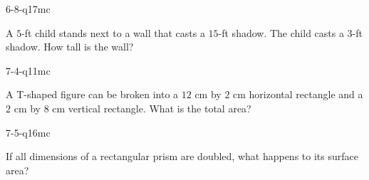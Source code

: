 \begin{practiceQuestion}{6-8-q17}{mc}
\begin{questionText}
A $5$-ft child stands next to a wall that casts a $15$-ft shadow. The child casts a $3$-ft shadow. How tall is the wall?
\end{questionText}
\end{practiceQuestion}

\begin{practiceQuestion}{7-4-q11}{mc}
\begin{questionText}
A T-shaped figure can be broken into a $12$ cm by $2$ cm horizontal rectangle and a $2$ cm by $8$ cm vertical rectangle. What is the total area?
\end{questionText}
\end{practiceQuestion}

\begin{practiceQuestion}{7-5-q16}{mc}
\begin{questionText}
If all dimensions of a rectangular prism are doubled, what happens to its surface area?
\end{questionText}
\end{practiceQuestion}

